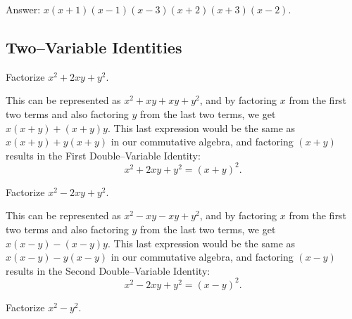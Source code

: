 \begin{solution}[name=Solution by Parviz Shahriari]
Answer: $x(x+1)(x-1)(x-3)(x+2)(x+3)(x-2)$.
\end{solution}

\subsection{Two--Variable Identities}



\begin{tcolorbox}
\begin{question}[name=(Positive Double--Variable Identity)]
Factorize $x^2 + 2xy + y^2$.
\end{question}
\end{tcolorbox}

\begin{solution}[name=Solution by Amir Parvardi]
This can be represented as $x^2+xy+xy+y^2$, and by factoring $x$ from the first two terms and also factoring $y$ from the last two terms, we get $x(x+y)+(x+y)y$. This last expression would be the same as $x(x+y)+y(x+y)$ in our commutative algebra, and factoring $(x+y)$ results in the First Double--Variable Identity: $$x^2+2xy+y^2=(x+y)^2.$$
\end{solution}




\begin{tcolorbox}
\begin{question}[name=(Negative Double--Variable Identity)]
Factorize $x^2 - 2xy + y^2$.
\end{question}
\end{tcolorbox}

\begin{solution}[name=Solution by Amir Parvardi]
This can be represented as $x^2-xy-xy+y^2$, and by factoring $x$ from the first two terms and also factoring $y$ from the last two terms, we get $x(x-y)-(x-y)y$. This last expression would be the same as $x(x-y)-y(x-y)$ in our commutative algebra, and factoring $(x-y)$ results in the Second Double--Variable Identity: $$x^2-2xy+y^2=(x-y)^2.$$
\end{solution}




\begin{tcolorbox}
\begin{question}[name=(Difference of Squares Identity)]
Factorize $x^2 - y^2$.
\end{question}
\end{tcolorbox}


